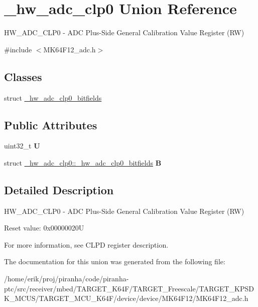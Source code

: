\hypertarget{union__hw__adc__clp0}{}\section{\+\_\+hw\+\_\+adc\+\_\+clp0 Union Reference}
\label{union__hw__adc__clp0}


H\+W\+\_\+\+A\+D\+C\+\_\+\+C\+L\+P0 -\/ A\+DC Plus-\/\+Side General Calibration Value Register (RW)  




{\ttfamily \#include $<$M\+K64\+F12\+\_\+adc.\+h$>$}

\subsection*{Classes}
\begin{DoxyCompactItemize}
\item 
struct \hyperlink{struct__hw__adc__clp0_1_1__hw__adc__clp0__bitfields}{\+\_\+hw\+\_\+adc\+\_\+clp0\+\_\+bitfields}
\end{DoxyCompactItemize}
\subsection*{Public Attributes}
\begin{DoxyCompactItemize}
\item 
uint32\+\_\+t {\bfseries U}\hypertarget{union__hw__adc__clp0_acec6b0c16015f35627262d48fd5983f8}{}\label{union__hw__adc__clp0_acec6b0c16015f35627262d48fd5983f8}

\item 
struct \hyperlink{struct__hw__adc__clp0_1_1__hw__adc__clp0__bitfields}{\+\_\+hw\+\_\+adc\+\_\+clp0\+::\+\_\+hw\+\_\+adc\+\_\+clp0\+\_\+bitfields} {\bfseries B}\hypertarget{union__hw__adc__clp0_aa5db3319bb0068650566f0437a3e81a3}{}\label{union__hw__adc__clp0_aa5db3319bb0068650566f0437a3e81a3}

\end{DoxyCompactItemize}


\subsection{Detailed Description}
H\+W\+\_\+\+A\+D\+C\+\_\+\+C\+L\+P0 -\/ A\+DC Plus-\/\+Side General Calibration Value Register (RW) 

Reset value\+: 0x00000020U

For more information, see C\+L\+PD register description. 

The documentation for this union was generated from the following file\+:\begin{DoxyCompactItemize}
\item 
/home/erik/proj/piranha/code/piranha-\/ptc/src/receiver/mbed/\+T\+A\+R\+G\+E\+T\+\_\+\+K64\+F/\+T\+A\+R\+G\+E\+T\+\_\+\+Freescale/\+T\+A\+R\+G\+E\+T\+\_\+\+K\+P\+S\+D\+K\+\_\+\+M\+C\+U\+S/\+T\+A\+R\+G\+E\+T\+\_\+\+M\+C\+U\+\_\+\+K64\+F/device/device/\+M\+K64\+F12/M\+K64\+F12\+\_\+adc.\+h\end{DoxyCompactItemize}
